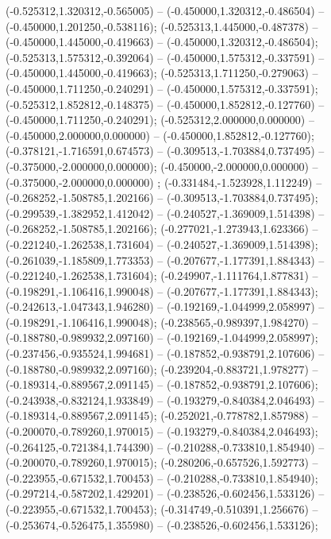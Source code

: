  (-0.525312,1.320312,-0.565005) -- (-0.450000,1.320312,-0.486504) -- (-0.450000,1.201250,-0.538116);
 (-0.525313,1.445000,-0.487378) -- (-0.450000,1.445000,-0.419663) -- (-0.450000,1.320312,-0.486504);
 (-0.525313,1.575312,-0.392064) -- (-0.450000,1.575312,-0.337591) -- (-0.450000,1.445000,-0.419663);
 (-0.525313,1.711250,-0.279063) -- (-0.450000,1.711250,-0.240291) -- (-0.450000,1.575312,-0.337591);
 (-0.525312,1.852812,-0.148375) -- (-0.450000,1.852812,-0.127760) -- (-0.450000,1.711250,-0.240291);
 (-0.525312,2.000000,0.000000) -- (-0.450000,2.000000,0.000000) -- (-0.450000,1.852812,-0.127760);
 (-0.378121,-1.716591,0.674573) -- (-0.309513,-1.703884,0.737495) -- (-0.375000,-2.000000,0.000000);
 (-0.450000,-2.000000,0.000000) -- (-0.375000,-2.000000,0.000000) ;
 (-0.331484,-1.523928,1.112249) -- (-0.268252,-1.508785,1.202166) -- (-0.309513,-1.703884,0.737495);
 (-0.299539,-1.382952,1.412042) -- (-0.240527,-1.369009,1.514398) -- (-0.268252,-1.508785,1.202166);
 (-0.277021,-1.273943,1.623366) -- (-0.221240,-1.262538,1.731604) -- (-0.240527,-1.369009,1.514398);
 (-0.261039,-1.185809,1.773353) -- (-0.207677,-1.177391,1.884343) -- (-0.221240,-1.262538,1.731604);
 (-0.249907,-1.111764,1.877831) -- (-0.198291,-1.106416,1.990048) -- (-0.207677,-1.177391,1.884343);
 (-0.242613,-1.047343,1.946280) -- (-0.192169,-1.044999,2.058997) -- (-0.198291,-1.106416,1.990048);
 (-0.238565,-0.989397,1.984270) -- (-0.188780,-0.989932,2.097160) -- (-0.192169,-1.044999,2.058997);
 (-0.237456,-0.935524,1.994681) -- (-0.187852,-0.938791,2.107606) -- (-0.188780,-0.989932,2.097160);
 (-0.239204,-0.883721,1.978277) -- (-0.189314,-0.889567,2.091145) -- (-0.187852,-0.938791,2.107606);
 (-0.243938,-0.832124,1.933849) -- (-0.193279,-0.840384,2.046493) -- (-0.189314,-0.889567,2.091145);
 (-0.252021,-0.778782,1.857988) -- (-0.200070,-0.789260,1.970015) -- (-0.193279,-0.840384,2.046493);
 (-0.264125,-0.721384,1.744390) -- (-0.210288,-0.733810,1.854940) -- (-0.200070,-0.789260,1.970015);
 (-0.280206,-0.657526,1.592773) -- (-0.223955,-0.671532,1.700453) -- (-0.210288,-0.733810,1.854940);
 (-0.297214,-0.587202,1.429201) -- (-0.238526,-0.602456,1.533126) -- (-0.223955,-0.671532,1.700453);
 (-0.314749,-0.510391,1.256676) -- (-0.253674,-0.526475,1.355980) -- (-0.238526,-0.602456,1.533126);

